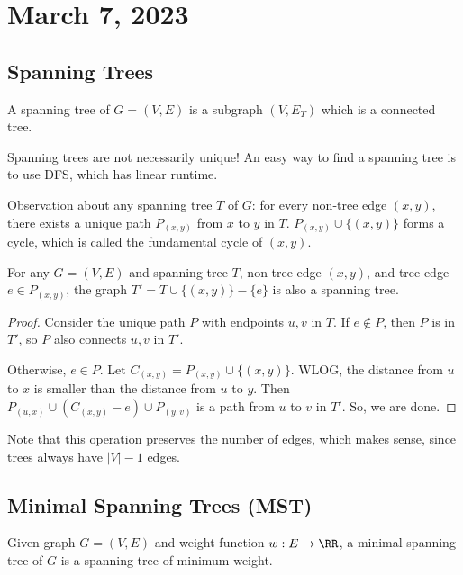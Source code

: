 \section{March 7, 2023}

\subsection{Spanning Trees}

\begin{definition}

A \ac{spanning tree} of $G=(V,E)$ is a subgraph $(V, E_T)$ which is a connected tree. 
\end{definition}

Spanning trees are not necessarily unique! An easy way to find a spanning tree is to use DFS, which has linear runtime. 

Observation about any spanning tree $T$ of $G$: for every non-tree edge $(x,y)$, there exists a unique path $P_{(x,y)}$ from $x$ to $y$ in $T$. $P_{(x,y)}\cup \{(x,y)\}$ forms a cycle, which is called the fundamental cycle of $(x,y)$. 

\begin{theorem}

For any $G=(V,E)$ and spanning tree $T$, non-tree edge $(x,y)$, and tree edge $e\in P_{(x,y)}$, the graph $T'=T\cup\{(x,y)\}-\{e\}$ is also a spanning tree. 
\end{theorem}

\begin{proof}
Consider the unique path $P$ with endpoints $u,v$ in $T$. If $e\notin P$, then $P$ is in $T'$, so $P$ also connects $u,v$ in $T'$. 

Otherwise, $e\in P$. Let $C_{(x,y)}=P_{(x,y)}\cup \{(x,y)\}$. WLOG, the distance from $u$ to $x$ is smaller than the distance from $u$ to $y$. Then $P_{(u,x)}\cup (C_{(x,y)}-e)\cup P_{(y,v)}$ is a path from $u$ to $v$ in $T'$. So, we are done. 
\end{proof}

Note that this operation preserves the number of edges, which makes sense, since trees always have $\vert V\vert - 1$ edges.

\subsection{Minimal Spanning Trees (MST)}

\begin{definition}

Given graph $G=(V,E)$ and weight function $w:E\rightarrow \RR$, a \ac{minimal spanning tree} of $G$ is a spanning tree of minimum weight. 
\end{definition}

